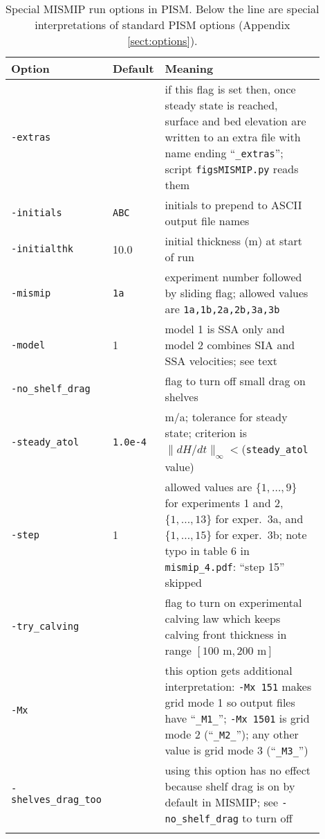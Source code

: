 \begin{table}[ht]
\caption{Special MISMIP run options in PISM.  Below the line are special interpretations of standard PISM options (Appendix \ref{sect:options}).}\label{tab:MISMIPoptions}
\small
\begin{tabular}{p{0.15\linewidth}p{0.1\linewidth}p{0.65\linewidth}}\hline
\textbf{Option} & \textbf{Default} & \textbf{Meaning} \\ \hline
\verb|-extras| &  & if this flag is set then, once steady state is reached, surface and bed elevation are written to an extra file with name ending ``\verb|_extras|''; script \verb|figsMISMIP.py| reads them\\
\verb|-initials| & \verb|ABC| & initials to prepend to ASCII output file names \\
\verb|-initialthk| & 10.0 & initial thickness (m) at start of run \\
\verb|-mismip| & \verb|1a| & experiment number followed by sliding flag; allowed values are \verb|1a,1b,2a,2b,3a,3b| \\
\verb|-model| & 1 & model 1 is SSA only and model 2 combines SIA and SSA velocities; see text \\
\verb|-no_shelf_drag| &  & flag to turn off small drag on shelves \\
\verb|-steady_atol| & \verb|1.0e-4| & m/a; tolerance for steady state; criterion is  $\|dH/dt\|_\infty <$(\verb|steady_atol| value) \\
\verb|-step| & 1 & allowed values are $\{1,\dots,9\}$ for experiments 1 and 2, $\{1,\dots,13\}$ for  exper.~3a, and $\{1,\dots,15\}$ for exper.~3b; note typo in table 6 in \verb|mismip_4.pdf|: ``step 15'' skipped \\
\verb|-try_calving| &  & flag to turn on experimental calving law which keeps  calving front thickness in range $[100\text{ m},200\text{ m}]$ \\
\hline
\verb|-Mx| &  & this option gets additional interpretation: \verb|-Mx 151| makes grid  mode 1 so output files have ``\verb|_M1_|''; \verb|-Mx 1501| is grid mode 2  (``\verb|_M2_|''); any other value is grid mode 3 (``\verb|_M3_|'')\\
\verb|-shelves_drag_too| &  & using this option has no effect because shelf drag is on by default in MISMIP; see \verb|-no_shelf_drag| to turn off\\
\hline\normalsize
\end{tabular}
\end{table}

